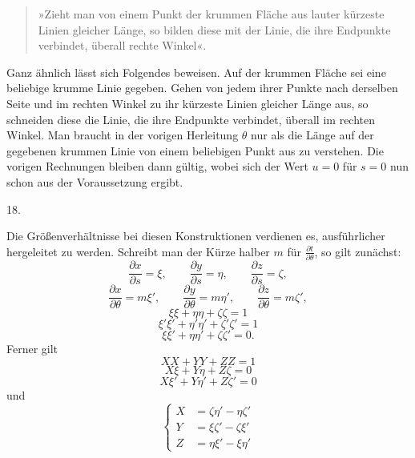 %
\begin{quote}
»Zieht man von einem Punkt der krummen Fläche aus lauter kürzeste Linien gleicher Länge, so bilden diese mit der Linie, die ihre Endpunkte verbindet, überall rechte Winkel«.
\end{quote}
\noindent\hspace*{1.2em}Ganz ähnlich lässt sich Folgendes beweisen. Auf der krummen Fläche sei eine beliebige krumme Linie gegeben. Gehen von jedem ihrer Punkte nach derselben Seite und im rechten Winkel zu ihr kürzeste Linien gleicher Länge aus, so schneiden diese die Linie, die ihre Endpunkte verbindet, überall im rechten Winkel. Man braucht in der vorigen Herleitung $\theta$ nur als die Länge auf der gegebenen krummen Linie von einem beliebigen Punkt aus zu verstehen. Die vorigen Rechnungen bleiben dann gültig, wobei sich der Wert $u=0$ für $s=0$ nun schon aus der Voraussetzung ergibt.

\begin{center}18.\end{center}
\noindent\hspace*{1.2em}Die Größenverhältnisse bei diesen Konstruktionen verdienen es, ausführlicher hergeleitet zu werden. Schreibt man der Kürze halber $m$ für $\frac{\partial t}{\partial\theta}$, so gilt zunächst:
\begin{equation}
\frac{\partial x}{\partial s}=\xi,\qquad\frac{\partial y}{\partial s}=\eta,\qquad\frac{\partial z}{\partial s}=\zeta,\tag{1}
\end{equation}
\begin{equation}
\frac{\partial x}{\partial\theta}=m\xi',\qquad\frac{\partial y}{\partial\theta}=m\eta',\qquad\frac{\partial z}{\partial\theta}=m\zeta',\tag{2}
\end{equation}
\begin{equation}\xi\xi+\eta\eta+\zeta\zeta=1\tag{3}\end{equation}
\begin{equation}\xi'\xi'+\eta'\eta'+\zeta'\zeta'=1\tag{4}\end{equation}
\begin{equation}\xi\xi'+\eta\eta'+\zeta\zeta'=0.\tag{5}\end{equation}
Ferner gilt
\begin{equation}XX+YY+ZZ=1\tag{6}\end{equation}
\begin{equation}X\xi+Y\eta+Z\zeta=0\tag{7}\end{equation}
\begin{equation}X\xi'+Y\eta'+Z\zeta'=0\tag{8}\end{equation}
und
\begin{equation}
\left\{\begin{aligned}X&=\zeta\eta'-\eta\zeta'\\Y&=\xi\zeta'-\zeta\xi'\\Z&=\eta\xi'-\xi\eta'\end{aligned}\right.\tag*{[9]}
\end{equation}

